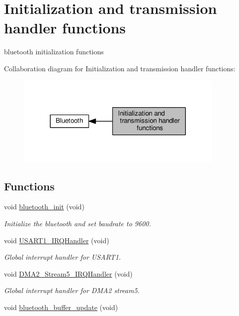 \hypertarget{group__bluetooth___init}{}\section{Initialization and transmission handler functions}
\label{group__bluetooth___init}


bluetooth initialization functions  


Collaboration diagram for Initialization and transmission handler functions\+:\nopagebreak
\begin{figure}[H]
\begin{center}
\leavevmode
\includegraphics[width=284pt]{d7/d87/group__bluetooth___init}
\end{center}
\end{figure}
\subsection*{Functions}
\begin{DoxyCompactItemize}
\item 
void \hyperlink{group__bluetooth___init_gaaa60810e0857e9e1e5b2cba80b8db3ff}{bluetooth\+\_\+init} (void)
\begin{DoxyCompactList}\small\item\em Initialize the bluetooth and set baudrate to 9600. \end{DoxyCompactList}\item 
void \hyperlink{group__bluetooth___init_ga7139cd4baabbbcbab0c1fe6d7d4ae1cc}{U\+S\+A\+R\+T1\+\_\+\+I\+R\+Q\+Handler} (void)
\begin{DoxyCompactList}\small\item\em Global interrupt handler for U\+S\+A\+R\+T1. \end{DoxyCompactList}\item 
void \hyperlink{group__bluetooth___init_gaef190d87febc0414eb7a39bd4c2d2169}{D\+M\+A2\+\_\+\+Stream5\+\_\+\+I\+R\+Q\+Handler} (void)
\begin{DoxyCompactList}\small\item\em Global interrupt handler for D\+M\+A2 stream5. \end{DoxyCompactList}\item 
void \hyperlink{group__bluetooth___init_ga351b2e7a8b3f7e5f29d3d1d22e293323}{bluetooth\+\_\+buffer\+\_\+update} (void)
\end{DoxyCompactItemize}


